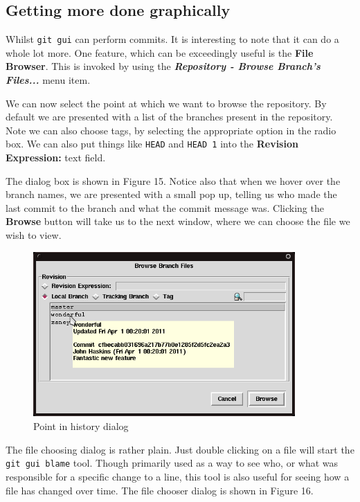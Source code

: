 \subsection{Getting more done graphically}
Whilst \texttt{git gui} can perform commits.  It is interesting to note that it can do a whole lot more.  One feature, which can be exceedingly useful is the \textbf{File Browser}.  This is invoked by using the \textbf{\emph{Repository - Browse Branch's Files...}} menu item.

We can now select the point at which we want to browse the repository.  By default we are presented with a list of the branches present in the repository.  Note we can also choose tags, by selecting the appropriate option in the radio box.  We can also put things like \texttt{HEAD} and \texttt{HEAD~1} into the \textbf{Revision Expression:} text field.  

The dialog box is shown in Figure 15.  Notice also that when we hover over the branch names, we are presented with a small pop up, telling us who made the last commit to the branch and what the commit message was.  Clicking the \textbf{Browse} button will take us to the next window, where we can choose the file we wish to view.

\begin{figure}[hbt]
\centering
\includegraphics[width=10cm]{images/f-w5-d15.png}
\caption{Point in history dialog}
\end{figure} 

The file choosing dialog is rather plain.  Just double clicking on a file will start the \texttt{git gui blame} tool.  Though primarily used as a way to see who, or what was responsible for a specific change to a line, this tool is also useful for seeing how a file has changed over time.  The file chooser dialog is shown in Figure 16.

